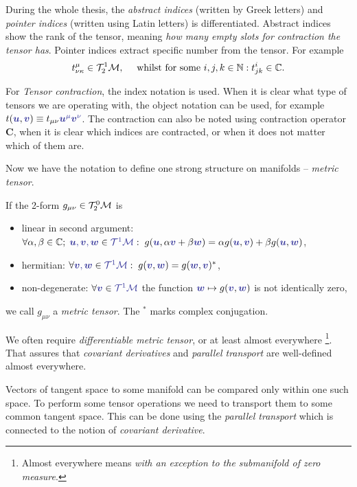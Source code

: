 During the whole thesis, the \emph{abstract indices} (written by Greek letters) and \emph{pointer indices} (written using Latin letters) is differentiated. Abstract indices show the rank of the tensor, meaning \emph{how many empty slots for contraction the tensor has}. Pointer indices extract specific number from the tensor. For example
$$t^\mu_{\nu\kappa} \in \mathcal{T}^1_2\mathcal{M}, \quad \text{ whilst for some }i,j,k\in\mathbb{N}: t^i_{jk}\in \mathbb C.$$

For \emph{Tensor contraction}, the index notation is used. When it is clear what type of tensors we are operating with, the object notation can be used, for example $t(\bluee{\bm u},\bluee{\bm v})\equiv t_{\mu\nu}\bluee{\bm u^\mu \bm v^\nu}$. The contraction can also be noted using contraction operator $\mathbf C$, when it is clear which indices are contracted, or when it does not matter which of them are.

Now we have the notation to define one strong structure on manifolds -- \emph{metric tensor}. 
\begin{definition}
If the 2-form $g_{\mu\nu}\in\mathcal{T}^0_2\mathcal{M}$ is
\begin{itemize}
    \item linear in second argument: $\forall \alpha,\beta\in\C;\; \bluee{\bm u,\bm v,\bm w}\in \bluee{\TT^1\M}: \; g(\bluee{\bm u},\alpha\bluee{\bm v}+\beta \bluee{\bm w}) = \alpha g(\bluee{\bm u},\bluee{\bm v})+\beta g(\bluee{\bm u},\bluee{\bm w})$,
    \item hermitian: $\forall \bluee{\bm v,\bm w}\in \bluee{\TT^1\M}: \; g(\bluee{\bm v},\bluee{\bm w})=g(\bluee{\bm w},\bluee{\bm v})^*$,
    \item non-degenerate: $\forall \bluee{\bm v}\in\bluee{\TT^1\M}$ the function $\bluee{\bm w}\mapsto g(\bluee{\bm v},\bluee{\bm w})$ is not identically zero,
\end{itemize} 
we call $g_{\mu\nu}$ a \emph{metric tensor}. The $^*$ marks complex conjugation.
\end{definition}

We often require \emph{differentiable metric tensor}, or at least almost everywhere \footnote{Almost everywhere means \emph{with an exception to the submanifold of zero measure}.}. That assures that \emph{covariant derivatives} and \emph{parallel transport} are well-defined almost everywhere. 




Vectors of tangent space to some manifold can be compared only within one such space. To perform some tensor operations we need to transport them to some common tangent space. This can be done using the \emph{parallel transport} which is connected to the notion of \emph{covariant derivative}.

